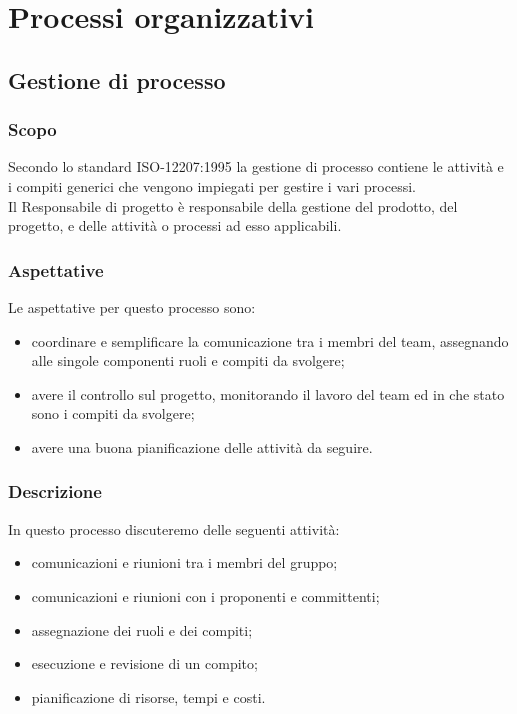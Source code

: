 \section{Processi organizzativi}

\subsection{Gestione di processo} \label{_gestioneDiProcesso}

\subsubsection{Scopo}
Secondo lo standard ISO-12207:1995 la gestione di processo contiene le attività e i compiti generici che vengono impiegati per gestire i vari processi.\\
Il Responsabile di progetto è responsabile della gestione del prodotto, del progetto, e delle attività o processi ad esso applicabili.
\subsubsection{Aspettative}
Le aspettative per questo processo sono:
\begin{itemize}
    \item coordinare e semplificare la comunicazione tra i membri del team, assegnando alle singole componenti ruoli e compiti da svolgere;
    \item avere il controllo sul progetto, monitorando il lavoro del team ed in che stato sono i compiti da svolgere;
    \item avere una buona pianificazione delle attività da seguire.
\end{itemize}

\subsubsection{Descrizione}
In questo processo discuteremo delle seguenti attività:
\begin{itemize}
    \item comunicazioni e riunioni tra i membri del gruppo;
    \item comunicazioni e riunioni con i proponenti e committenti;
    \item assegnazione dei ruoli e dei compiti;
    \item esecuzione e revisione di un compito;
    \item pianificazione di risorse, tempi e costi.
\end{itemize}


